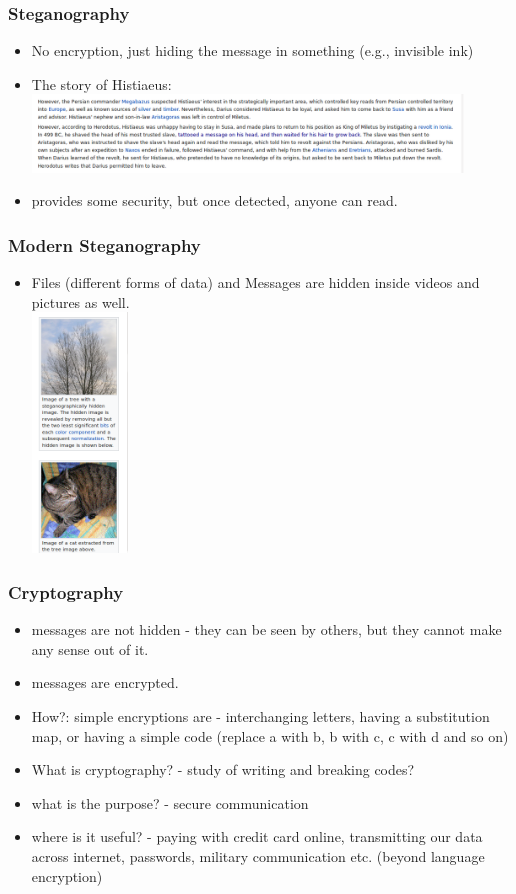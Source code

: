 \documentclass{beamer}
\begin{document}
\begin{frame}
\frametitle{Steganography}
\begin{itemize}
\item No encryption, just hiding the message in something (e.g., invisible ink)
\pause \item The story of Histiaeus:
\includegraphics[width=0.9\textwidth]{histiaeus.png}
\item provides some security, but once detected, anyone can read. 
\end{itemize}
\end{frame}

\begin{frame}
\frametitle{Modern Steganography}
\begin{itemize}
\item Files (different forms of data) and Messages are hidden inside videos and pictures as well.
\\ \includegraphics[width=0.2\textwidth]{steg.png}
\end{itemize}
\end{frame}

\begin{frame}
\frametitle{Cryptography}
\begin{itemize}
\item messages are not hidden - they can be seen by others, but they cannot make any sense out of it. 
\item messages are encrypted.
\item How?: simple encryptions are - interchanging letters, having a substitution map, or having a simple code (replace a with b, b with c, c with d and so on) \pause
\item What is cryptography? \pause - study of writing and breaking codes? 
\item what is the purpose? \pause - secure communication
\item where is it useful? \pause - paying with credit card online, transmitting our data across internet, passwords, military communication etc. (beyond language encryption)
\end{itemize}
\end{frame}
\end{document}
